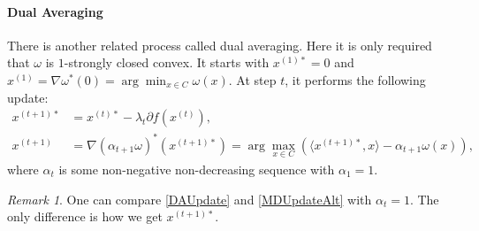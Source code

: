 \documentclass[openany]{book}
\theoremstyle{definition}
\theoremstyle{remark}
\newtheorem*{remark}{Remark}
\begin{document}
\paragraph{Dual Averaging}
There is another related process called dual averaging. Here it is only required that $\omega$ is $1$-strongly closed convex. It starts with $x^{(1)*}=0$ and $x^{(1)}=\nabla\omega^*(0)=\arg\min_{x\in C}\omega(x)$. At step $t$, it performs the following update:
\begin{equation}\label{DAUpdate}
    \begin{split}
        x^{(t+1)*} & =x^{(t)*}-\lambda_t\partial f(x^{(t)}), \\
        x^{(t+1)} & =\nabla(\alpha_{t+1}\omega)^*(x^{(t+1)*})=\arg\max_{x\in C}\left(\langle x^{(t+1)*},x\rangle-\alpha_{t+1}\omega(x)\right),
    \end{split}
\end{equation}
where $\alpha_t$ is some non-negative non-decreasing sequence with $\alpha_1=1$.
\begin{remark}
    One can compare \eqref{DAUpdate} and \eqref{MDUpdateAlt} with $\alpha_t=1$. The only difference is how we get $x^{(t+1)*}$.
\end{remark}
\end{document}
